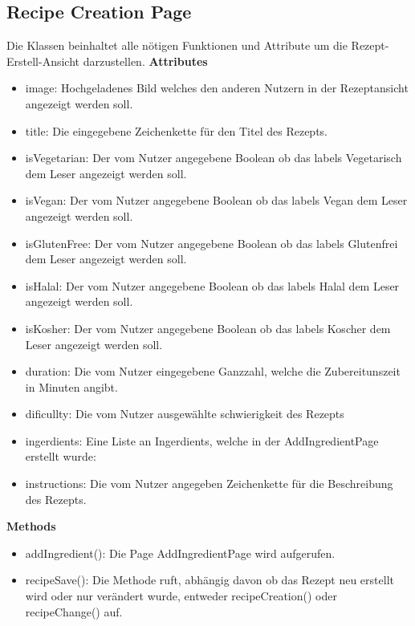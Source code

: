 \documentclass[parskip=full]{scrartcl}
\begin{document}
    \subsection{Recipe Creation Page}
        Die Klassen beinhaltet alle nötigen Funktionen und Attribute um die Rezept-Erstell-Ansicht darzustellen.\newline
        \textbf{Attributes}
        \begin{itemize}
            \item image: Hochgeladenes Bild welches den anderen Nutzern in der Rezeptansicht angezeigt werden soll.
            \item title: Die eingegebene Zeichenkette für den Titel des Rezepts.
            \item isVegetarian: Der vom Nutzer angegebene Boolean ob das \gls{labels} Vegetarisch dem Leser angezeigt werden soll.
            \item isVegan: Der vom Nutzer angegebene Boolean ob das \gls{labels} Vegan dem Leser angezeigt werden soll.
            \item isGlutenFree: Der vom Nutzer angegebene Boolean ob das \gls{labels} Glutenfrei dem Leser angezeigt werden soll.
            \item isHalal: Der vom Nutzer angegebene Boolean ob das \gls{labels} Halal dem Leser angezeigt werden soll.
            \item isKosher: Der vom Nutzer angegebene Boolean ob das \gls{labels} Koscher dem Leser angezeigt werden soll.
            \item duration: Die vom Nutzer eingegebene Ganzzahl, welche die Zubereitunszeit in Minuten angibt.
            \item dificullty: Die vom Nutzer ausgewählte \gls{schwierigkeit} des Rezepts
            \item ingerdients: Eine Liste an Ingerdients, welche in der AddIngredientPage erstellt wurde:
            \item instructions: Die vom Nutzer angegeben Zeichenkette für die Beschreibung des Rezepts.
        \end{itemize}
        
        \textbf{Methods}
        \begin{itemize}
            \item addIngredient(): Die Page AddIngredientPage wird aufgerufen.
            \item recipeSave(): Die Methode ruft, abhängig davon ob das Rezept neu erstellt wird oder nur verändert wurde, entweder recipeCreation() oder recipeChange() auf.
        \end{itemize}
\end{document}
